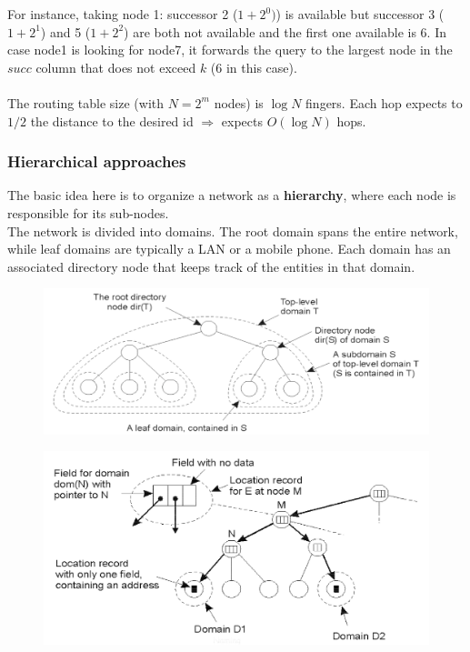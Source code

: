 \documentclass[10pt,a4paper]{article}
\begin{document}
\begin{itemize}
\begin{figure}[h!]
  \label{fig:chord-routing}
\end{figure}
For instance, taking node 1: successor 2 ($1+2^0)$) is available but successor 3 ($1+2^1$) and 5 ($1+2^2$) are both not available and the first one available is 6. In case node1 is looking for node7, it forwards the query to the largest node in the $succ$ column that does not exceed $k$ (6 in this case). \\ \\
The routing table size (with $N=2^m$ nodes) is $ \log{N}$ fingers. Each hop expects to $1/2$ the distance to the desired id $\Rightarrow$ expects $ O(\log{N})$ hops.
\end{itemize}
\subsubsection{Hierarchical approaches}
The basic idea here is to organize a network as a \textbf{hierarchy}, where each node is responsible for its sub-nodes. \\
The network is divided into domains. The root domain spans the entire network, while leaf domains are typically a LAN or a mobile phone. Each domain has an associated directory node that keeps track of the entities in that domain. 
\begin{figure}[h!]
\centering
\begin{minipage}{.5\textwidth}
  \centering
  \includegraphics[width=.9\linewidth]{images/hierarchical.png}
  \label{fig:hierarchical}
\end{minipage}%
\begin{minipage}{.5\textwidth}
  \centering
  \includegraphics[width=.9\linewidth]{images/hierarchical2.png}
  \label{fig:hierarchical2}
\end{minipage}
\end{figure} 
\end{document}

